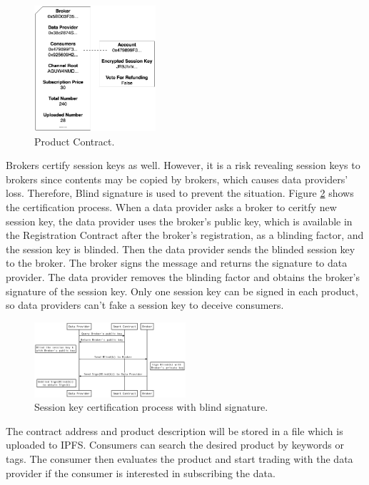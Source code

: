 \documentclass[journal,a4paper]{IEEEtran}
\begin{document}
\begin{figure}[h]
\centering
\includegraphics[width=0.4\textwidth]{product_contract}
\caption{Product Contract.}
\label{fig:product_contract}
\end{figure}

Brokers certify session keys as well. However, it is a risk revealing session keys to brokers since contents may be copied by brokers, which causes data providers' loss. Therefore, Blind signature is used to prevent the situation. Figure \ref{fig:key_certification} shows the certification process. When a data provider asks a broker to ceritfy new session key, the data provider uses the broker's public key, which is available in the Registration Contract after the broker's registration, as a blinding factor, and the session key is blinded. Then the data provider sends the blinded session key to the broker. The broker signs the message and returns the signature to data provider. The data provider removes the blinding factor and obtains the broker's signature of the session key. Only one session key can be signed in each product, so data providers can't fake a session key to deceive consumers.

\begin{figure}[h]
	\centering
	\includegraphics[width=0.5\textwidth]{key_certification}
	\caption{Session key certification process with blind signature.}
	\label{fig:key_certification}
\end{figure}

The contract address and product description will be stored in a file which is uploaded to IPFS. Consumers can search the desired product by keywords or tags. The consumer then evaluates the product and start trading with the data provider if the consumer is interested in subscribing the data.
\end{document}
